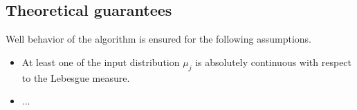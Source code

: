 \subsection{Theoretical guarantees}

Well behavior of the algorithm is ensured for the following assumptions.
\begin{itemize}
    \item At least one of the input distribution $\mu_j$ is absolutely continuous with respect to the Lebesgue measure.
    \item ...
\end{itemize}